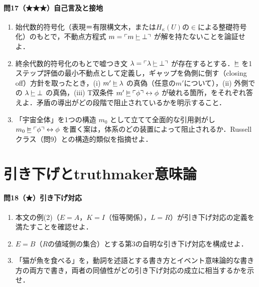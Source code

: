 \documentclass[../../main-detail.tex]{subfiles}
\begin{document}
\paragraph{問17（★★★）自己言及と接地}
\begin{enumerate}[label=(\alph*)]
    \item 始代数的符号化（表現＝有限構文木，または$H_\kappa(U)$の$\in$による整礎符号化）のもとで，不動点方程式 $m = \ulcorner m \mathrel{\underline{\vdash}} \bot \urcorner$ が解を持たないことを論証せよ．
    \item 終余代数的符号化のもとで嘘つき文 $\lambda = \ulcorner \lambda \mathrel{\underline{\vdash}} \bot \urcorner$ が存在するとする．$\mathrel{\underline{\vDash}}$ を1ステップ評価の最小不動点として定義し，ギャップを偽側に倒す（closing off）方針を取ったとき，(i) $m' \mathrel{\underline{\vDash}} \lambda$ の真偽（任意の$m'$について），(ii) 外側での $\lambda \mathrel{\underline{\vdash}} \bot$ の真偽，(iii) T双条件 $m' \mathrel{\underline{\vDash}} \ulcorner \phi \urcorner \leftrightarrow \phi$ が破れる箇所，をそれぞれ答えよ．矛盾の導出がどの段階で阻止されているかを明示すること．
    \item 「宇宙全体」を1つの構造 $m_0$ として立てて全面的な引用剥がし $m_0 \mathrel{\underline{\vDash}} \ulcorner \phi \urcorner \leftrightarrow \phi$ を置く案は，体系のどの装置によって阻止されるか．Russellクラス（問9）との構造的類似を指摘せよ．
\end{enumerate}

\section{引き下げとtruthmaker意味論}

\paragraph{問18（★）引き下げ対応}
\begin{enumerate}[label=(\alph*)]
    \item 本文の例(2)（$E = A$，$K = I$（恒等関係），$L = R$）が引き下げ対応の定義を満たすことを確認せよ．
    \item $E = B$（$R$の値域側の集合）とする第3の自明な引き下げ対応を構成せよ．
    \item 「猫が魚を食べる」を，動詞を述語とする書き方とイベント意味論的な書き方の両方で書き，両者の同値性がどの引き下げ対応の成立に相当するかを示せ．
\end{enumerate}
\end{document}
